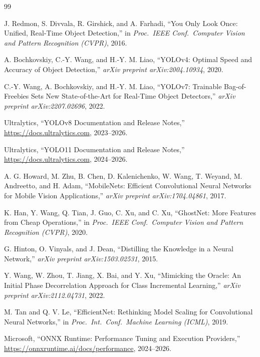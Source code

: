 \documentclass[11pt,a4paper]{article}
\begin{document}
\begin{thebibliography}{99}

J. Redmon, S. Divvala, R. Girshick, and A. Farhadi,
``You Only Look Once: Unified, Real-Time Object Detection,''
in \textit{Proc.\ IEEE Conf.\ Computer Vision and Pattern Recognition (CVPR)}, 2016.

A. Bochkovskiy, C.-Y. Wang, and H.-Y. M. Liao,
``YOLOv4: Optimal Speed and Accuracy of Object Detection,''
\textit{arXiv preprint arXiv:2004.10934}, 2020.

C.-Y. Wang, A. Bochkovskiy, and H.-Y. M. Liao,
``YOLOv7: Trainable Bag-of-Freebies Sets New State-of-the-Art for Real-Time Object
Detectors,''
\textit{arXiv preprint arXiv:2207.02696}, 2022.

Ultralytics,
``YOLOv8 Documentation and Release Notes,''
\url{https://docs.ultralytics.com}, 2023--2026.

Ultralytics,
``YOLO11 Documentation and Release Notes,''
\url{https://docs.ultralytics.com}, 2024--2026.

A. G. Howard, M. Zhu, B. Chen, D. Kalenichenko, W. Wang, T. Weyand, M. Andreetto,
and H. Adam,
``MobileNets: Efficient Convolutional Neural Networks for Mobile Vision Applications,''
\textit{arXiv preprint arXiv:1704.04861}, 2017.

K. Han, Y. Wang, Q. Tian, J. Guo, C. Xu, and C. Xu,
``GhostNet: More Features from Cheap Operations,''
in \textit{Proc.\ IEEE Conf.\ Computer Vision and Pattern Recognition (CVPR)}, 2020.

G. Hinton, O. Vinyals, and J. Dean,
``Distilling the Knowledge in a Neural Network,''
\textit{arXiv preprint arXiv:1503.02531}, 2015.

Y. Wang, W. Zhou, T. Jiang, X. Bai, and Y. Xu,
``Mimicking the Oracle: An Initial Phase Decorrelation Approach for Class Incremental
Learning,''
\textit{arXiv preprint arXiv:2112.04731}, 2022.

M. Tan and Q. V. Le,
``EfficientNet: Rethinking Model Scaling for Convolutional Neural Networks,''
in \textit{Proc.\ Int.\ Conf.\ Machine Learning (ICML)}, 2019.

Microsoft,
``ONNX Runtime: Performance Tuning and Execution Providers,''
\url{https://onnxruntime.ai/docs/performance}, 2024--2026.

\end{thebibliography}
\end{document}
